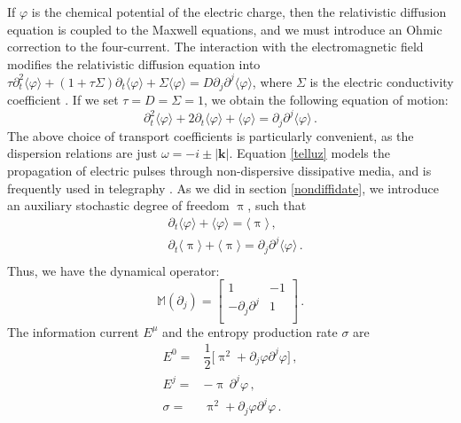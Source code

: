 \documentclass[a4paper, amsfonts, amssymb, amsmath, reprint, showkeys, nofootinbib, twoside,notitlepage,onecolumn]{revtex4-2}
\newcommand{\Ma}{{\mathbb{M}}}
\newcommand{\kb}{{\textbf{k}}}
\theoremstyle{definition}
\begin{document}
If $\varphi$ is the chemical potential of the electric charge, then the relativistic diffusion equation is coupled to the Maxwell equations, and we must introduce an Ohmic correction to the four-current. The interaction with the electromagnetic field modifies the relativistic diffusion equation into $\tau \partial^2_t \langle \varphi \rangle +(1{+}\tau \Sigma)\partial_t \langle \varphi \rangle+\Sigma \langle \varphi \rangle = D\partial_j \partial^j \langle \varphi \rangle$, where $\Sigma$ is the electric conductivity coefficient \cite{Gavassino:2024ufs}. If we set $\tau=D=\Sigma=1$, we obtain the following equation of motion:
\begin{equation}\label{telluz}
     \partial^2_t \langle \varphi \rangle +2\partial_t \langle \varphi \rangle+ \langle \varphi \rangle = \partial_j \partial^j \langle \varphi \rangle \, .
\end{equation}
The above choice of transport coefficients is particularly convenient, as the dispersion relations are just $\omega{=}-i\pm |\kb|$. Equation \eqref{telluz} models the propagation of electric pulses through non-dispersive dissipative media, and is frequently used in telegraphy \cite{CourantHilbert2_book}. As we did in section \ref{nondiffidate}, we introduce an auxiliary stochastic degree of freedom $\uppi$, such that
\begin{equation}\label{equiboo}
\begin{split}
& \partial_t \langle \varphi \rangle +\langle \varphi \rangle = \langle \uppi \rangle \, , \\
& \partial_t \langle \uppi \rangle +\langle \uppi \rangle = \partial_j \partial^j \langle \varphi \rangle \, . \\
\end{split}
\end{equation}
Thus, we have the dynamical operator:
\begin{equation}
    \Ma(\partial_j) = 
    \begin{bmatrix}
        1 & -1 \\
        -\partial_j \partial^j & 1 \\
    \end{bmatrix} \, .
\end{equation}
The information current $E^\mu$ and the entropy production rate $\sigma$ are
\begin{equation}\label{INFOONA2}
\begin{split}
E^0 ={}& \dfrac{1}{2} \big[ \uppi^2+ \partial_j \varphi \partial^j \varphi \big] \, ,\\
E^j ={}& - \uppi \, \partial^j \varphi \, ,\\
\sigma ={}&  \uppi^2 + \partial_j \varphi \partial^j \varphi \, . \\
\end{split}
\end{equation}
\end{document}
